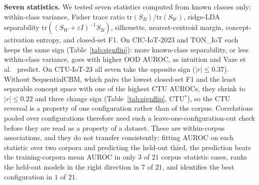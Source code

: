 \documentclass[journal]{IEEEtran}
\begin{document}
\textbf{Seven statistics.} We tested seven statistics computed from known classes only: within-class variance, Fisher trace ratio $\mathrm{tr}(S_B)/\mathrm{tr}(S_W)$, ridge-LDA separability $\mathrm{tr}((S_W{+}\varepsilon I)^{-1}S_B)$, silhouette, nearest-centroid margin, concept-activation entropy, and closed-set F1. On CIC-IoT-2023 and TON\_IoT each keeps the same sign (Table~\ref{tab:signflip}): more known-class separability, or less within-class variance, goes with higher OOD AUROC, as intuition and Vaze et al.~\cite{vaze2022openset} predict. On CTU-IoT-23 all seven take the opposite sign ($|r|\le0.37$). Without SequentialCBM, which pairs the lowest closed-set F1 and the least separable concept space with one of the highest CTU AUROCs, they shrink to $|r|\le0.22$ and three change sign (Table~\ref{tab:signflip}, CTU$^\ast$), so the CTU reversal is a property of one configuration rather than of the corpus. Correlations pooled over configurations therefore need such a leave-one-configuration-out check before they are read as a property of a dataset. These are within-corpus associations, and they do not transfer consistently: fitting AUROC on each statistic over two corpora and predicting the held-out third, the prediction beats the training-corpora mean AUROC in only $3$ of $21$ corpus--statistic cases, ranks the held-out models in the right direction in $7$ of $21$, and identifies the best configuration in $1$ of $21$.
\end{document}
